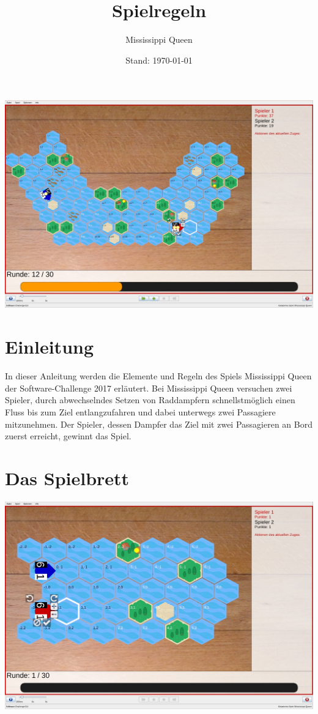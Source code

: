 \documentclass[12pt,a4paper, ngerman, oneside]{scrartcl}
\title{Spielregeln}
\subtitle{Mississippi Queen}
\date{Stand: \today}
\begin{document}
\maketitle
\includegraphics[width=\textwidth]{bilder/spielfeld-gross.jpg}
\vspace*{\fill}
\thispagestyle{empty}

\newpage
\tableofcontents
\thispagestyle{empty}
\newpage
\setcounter{page}{1}

\section{Einleitung}

In dieser Anleitung werden die Elemente und Regeln des Spiels Mississippi Queen
der Software-Challenge 2017 erläutert. Bei Mississippi Queen versuchen zwei
Spieler, durch abwechselndes Setzen von Raddampfern schnellstmöglich einen Fluss
bis zum Ziel entlangzufahren und dabei unterwegs zwei Passagiere mitzunehmen.
Der Spieler, dessen Dampfer das Ziel mit zwei Passagieren an Bord zuerst
erreicht, gewinnt das Spiel.


\section{Das Spielbrett}

\includegraphics[width=\textwidth]{bilder/spielfeld-anfang.jpg}
\end{document}
